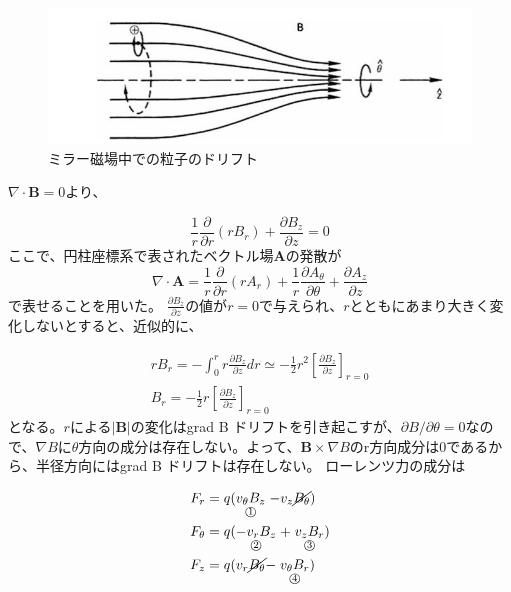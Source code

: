 \documentclass{ltjsarticle}
\numberwithin{equation}{section} %
\newcommand{\underlab}[3][.35ex]{%
  \mathrel{\mathop{#2}\limits_{\mathclap{\lower#1\hbox{\text{\footnotesize\textcircled{\scriptsize #3}}}}}}%
}
\begin{document}
\begin{figure}[htbp]
  \centering
  \includegraphics[width=0.7\linewidth]{magnetic_mirror.png}
  \caption{ミラー磁場中での粒子のドリフト}
  \label{fig.mirror}
\end{figure}

$\nabla \cdot \bm{B} = 0$より、

\begin{equation}
  \frac{1}{r}\frac{\partial}{\partial r}(rB_r) + \frac{\partial B_z}{\partial z} = 0
\end{equation}
ここで、円柱座標系で表されたベクトル場$\bm{A}$の発散が
\[
  \nabla \cdot \bm{A} = \frac{1}{r}\frac{\partial}{\partial r}(rA_r) + \frac{1}{r}\frac{\partial A_\theta}{\partial \theta} + \frac{\partial A_z}{\partial z}
\]
で表せることを用いた。
$\frac{\partial B_z}{\partial z}$の値が$r=0$で与えられ、$r$とともにあまり大きく変化しないとすると、近似的に、

\begin{equation}
  \begin{gathered}
    rB_r = -\int_{0}^{r} r\frac{\partial B_z}{\partial z}dr \simeq -\frac{1}{2}r^2\left[\frac{\partial B_z}{\partial z}\right]_{r=0}\\
    B_r = -\frac{1}{2}r\left[\frac{\partial B_z}{\partial z}\right]_{r=0}    
  \end{gathered} \label{term1234}
\end{equation}
となる。$r$による$|\bm{B}|$の変化はgrad B ドリフトを引き起こすが、$\partial B/\partial \theta = 0$なので、$\nabla B$に$\theta$方向の成分は存在しない。よって、$\bm{B}\times \nabla B$のr方向成分は0であるから、半径方向にはgrad B ドリフトは存在しない。
ローレンツ力の成分は

\begin{align}
  \begin{split}
    F_r     &= q(\underlab{v_\theta B_z}{1}-v_z \cancel{B_\theta})\\
    F_\theta&= q(\underlab{-v_r B_z}{2}+\underlab{v_z B_r}{3})\\
    F_z     &= q(v_r \cancel{B_\theta}-\underlab{v_\theta B_r}{4})
  \end{split}
\end{align}
\end{document}
